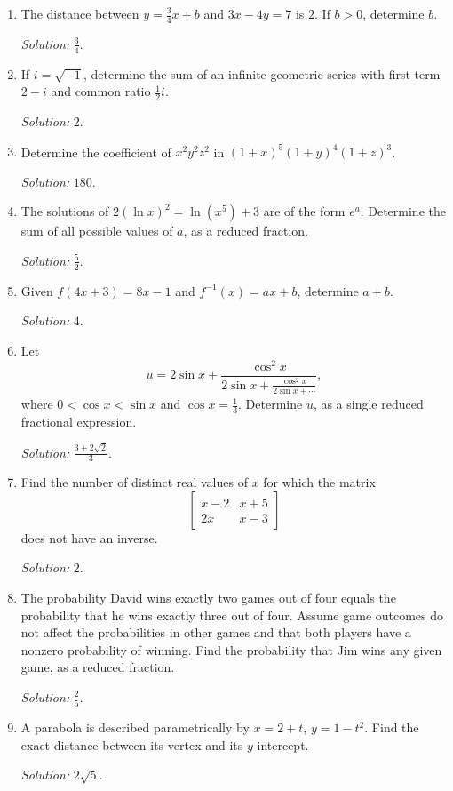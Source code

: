 \documentclass[11pt]{article}
\begin{document}
\begin{enumerate}[label=\textbf{\arabic*.}]
\item The distance between $y=\frac34x+b$ and $3x-4y=7$ is $2$. If $b>0$, determine $b$.\par\textit{Solution: }$\frac34$.

\item If $i=\sqrt{-1}$, determine the sum of an infinite geometric series with first term $2-i$ and common ratio $\frac12i$.\par\textit{Solution: }$2$.

\item Determine the coefficient of $x^2y^2z^2$ in $(1+x)^5(1+y)^4(1+z)^3$.\par\textit{Solution: }$180$.

\item The solutions of $2(\ln x)^2=\ln(x^5)+3$ are of the form $e^a$. Determine the sum of all possible values of $a$, as a reduced fraction.\par\textit{Solution: }$\frac52$.

\item Given $f(4x+3)=8x-1$ and $f^{-1}(x)=ax+b$, determine $a+b$.\par\textit{Solution: }$4$.

\item Let
\[
u=2\sin x+\frac{\cos^2x}{2\sin x+\frac{\cos^2x}{2\sin x+\cdots}},
\]
where $0<\cos x<\sin x$ and $\cos x=\frac13$. Determine $u$, as a single reduced fractional expression.\par\textit{Solution: }$\frac{3+2\sqrt2}{3}$.

\item Find the number of distinct real values of $x$ for which the matrix
\[
\begin{bmatrix}x-2&x+5\\2x&x-3\end{bmatrix}
\]
does not have an inverse.\par\textit{Solution: }$2$.

\item The probability David wins exactly two games out of four equals the probability that he wins exactly three out of four. Assume game outcomes do not affect the probabilities in other games and that both players have a nonzero probability of winning. Find the probability that Jim wins any given game, as a reduced fraction.\par\textit{Solution: }$\frac25$.

\item A parabola is described parametrically by $x=2+t$, $y=1-t^2$. Find the exact distance between its vertex and its $y$-intercept.\par\textit{Solution: }$2\sqrt5$.


\end{enumerate}
\end{document}
